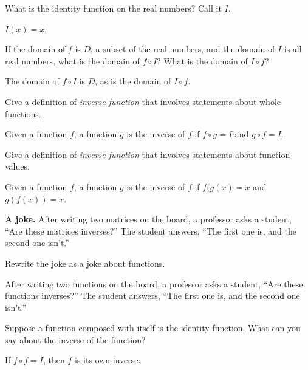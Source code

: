 \documentclass{ximera}
\begin{document}
\begin{question}
What is the identity function on the real numbers?  Call it $I$.  
\begin{freeResponse}
$I(x)=x$.
\end{freeResponse}
\end{question}

\begin{question}
If the domain of $f$ is $D$, a subset of the real numbers, and the domain of $I$ is all real numbers, what is the domain of $f\circ I$?  What is the domain of  $I\circ f$?  
\begin{freeResponse}
The domain of $f\circ I$ is $D$, as is the domain of  $I\circ f$. 
\end{freeResponse}
\end{question}

\begin{question}
Give a definition of \emph{inverse function} that involves statements about whole functions.  
\begin{freeResponse}
Given a function $f$, a function $g$ is the inverse of $f$ if $f\circ g = I$ and $g\circ f = I$.  
\end{freeResponse}
\end{question}

\begin{question}
Give a definition of \emph{inverse function} that involves statements about function values.    
\begin{freeResponse}
Given a function $f$, a function $g$ is the inverse of $f$ if $f(g(x) = x$ and $g(f(x)) = x$.  
\end{freeResponse}
\end{question}

\textbf{A joke.}  After writing two matrices on the board, a professor asks a student, ``Are these matrices inverses?''  The student answers, ``The first one is, and the second one isn't.''  

\begin{question}
Rewrite the joke as a joke about functions.  
\begin{freeResponse}
After writing two functions on the board, a professor asks a student, ``Are these functions inverses?''  The student answers, ``The first one is, and the second one isn't.''  
\end{freeResponse}
\end{question}

\begin{question}
Suppose a function composed with itself is the identity function.  What can you say about the inverse of the function?
\begin{freeResponse}
If $f\circ f = I$, then $f$ is its own inverse.  
\end{freeResponse}
\end{question}
\end{document}
